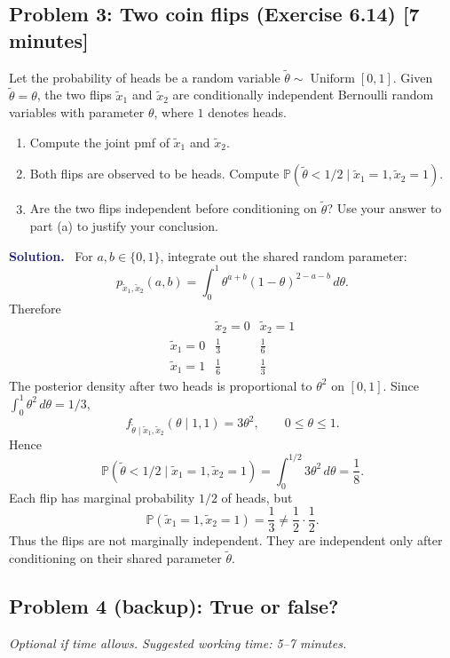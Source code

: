 \documentclass[11pt]{article}
\newcommand{\Pbb}{\mathbb{P}}
\newcommand{\rv}[1]{\widetilde{#1}}
\newenvironment{answer}{%
    \par\medskip\noindent\textcolor{MidnightBlue}{\textbf{Solution.}}\ }
    {\par\medskip}
\newcommand{\workingspace}[1]{}
\newcommand{\workingspace}[1]{\vspace{#1}}
\begin{document}
\subsection*{Problem 3: Two coin flips (Exercise 6.14) \hfill [7 minutes]}
Let the probability of heads be a random variable
$\rv{\theta}\sim\operatorname{Uniform}[0,1]$.  Given $\rv{\theta}=\theta$,
the two flips $\rv{x}_1$ and $\rv{x}_2$ are conditionally independent
Bernoulli random variables with parameter $\theta$, where $1$ denotes heads.
\begin{enumerate}[label=(\alph*),itemsep=0.45em]
  \item Compute the joint pmf of $\rv{x}_1$ and $\rv{x}_2$.
  \item Both flips are observed to be heads.  Compute
        $\Pbb(\rv{\theta}<1/2\mid\rv{x}_1=1,\rv{x}_2=1)$.
  \item Are the two flips independent before conditioning on $\rv{\theta}$?
        Use your answer to part (a) to justify your conclusion.
\end{enumerate}
\workingspace{5.4cm}

\begin{answer}
For $a,b\in\{0,1\}$, integrate out the shared random parameter:
\[
  p_{\rv{x}_1,\rv{x}_2}(a,b)
  =\int_0^1 \theta^{a+b}(1-\theta)^{2-a-b}\,d\theta.
\]
Therefore
\[
\begin{array}{c|cc}
 & \rv{x}_2=0 & \rv{x}_2=1\\
\hline
\rv{x}_1=0 & \frac13 & \frac16\\[0.2em]
\rv{x}_1=1 & \frac16 & \frac13
\end{array}
\]
The posterior density after two heads is proportional to $\theta^2$ on
$[0,1]$.  Since $\int_0^1\theta^2\,d\theta=1/3$,
\[
  f_{\rv{\theta}\mid\rv{x}_1,\rv{x}_2}(\theta\mid1,1)=3\theta^2,
  \qquad 0\leq\theta\leq1.
\]
Hence
\[
  \Pbb(\rv{\theta}<1/2\mid\rv{x}_1=1,\rv{x}_2=1)
  =\int_0^{1/2}3\theta^2\,d\theta
  =\boxed{\frac18}.
\]
Each flip has marginal probability $1/2$ of heads, but
\[
  \Pbb(\rv{x}_1=1,\rv{x}_2=1)=\frac13
  \neq \frac12\cdot\frac12.
\]
Thus the flips are not marginally independent.  They are independent only
after conditioning on their shared parameter $\rv{\theta}$.
\end{answer}

\newpage
\subsection*{Problem 4 (backup): True or false?}
\noindent\textit{Optional if time allows. Suggested working time: 5--7 minutes.}
\end{document}
